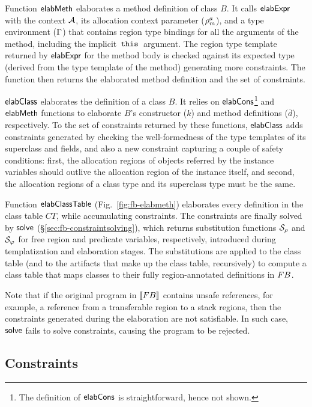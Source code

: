 Function ${\sf elabMeth}$ elaborates a method definition of class $B$. It
calls ${\sf elabExpr}$ with the context ${\mathcal{A}}$, its allocation context
parameter ($\rho^a_m$), and a type environment ($\Gamma$) that
contains region type bindings for all the arguments of the method,
including the implicit $\,{\tt this}\,$ argument. The region type template
returned by ${\sf elabExpr}$ for the method body is checked against its
expected type (derived from the type template of the method)
generating more constraints. The function then returns the elaborated
method definition and the set of constraints.

${\sf elabClass}$ elaborates the definition of a class $B$. It relies on
${\sf elabCons}$\footnote{The definition of ${\sf elabCons}$ is straightforward,
hence not shown.} and ${\sf elabMeth}$ functions to elaborate $B$'s
constructor ($k$) and method definitions ($\bar{d}$), respectively. To
the set of constraints returned by these functions, ${\sf elabClass}$ adds
constraints generated by checking the well-formedness of the type
templates of its superclass and fields, and also a new constraint
capturing a couple of safety conditions: first, the allocation regions
of objects referred by the instance variables should outlive the
allocation region of the instance itself, and second, the allocation
regions of a class type and its superclass type must be the same.

Function ${\sf elabClassTable}$ (Fig.~\ref{fig:fb-elabmeth}) elaborates
every definition in the class table $CT$, while accumulating
constraints. The constraints are finally solved by ${\sf solve}$
(\S\ref{sec:fb-constraintsolving}), which returns substitution
functions $\mathcal{S}_\rho$ and $\mathcal{S}_\varphi$ for free region and
predicate variables, respectively, introduced during templatization
and elaboration stages. The substitutions are applied to the class
table (and to the artifacts that make up the class table, recursively)
to compute a class table that maps classes to their fully
region-annotated definitions in ${\sc FB}$.

Note that if the original program in $\llbracket {\sc FB} \rrbracket$ contains unsafe
references, for example, a reference from a transferable region to a
stack regions, then the constraints generated during the elaboration
are not satisfiable. In such case, ${\sf solve}$ fails to solve
constraints, causing the program to be rejected.

\subsection{Constraints}
\label{sec:fb-constraintsem}

